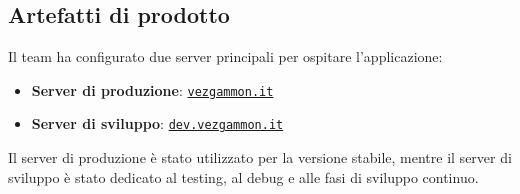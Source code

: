 \documentclass{article}
\begin{document}
\subsection{Artefatti di prodotto}

Il team ha configurato due server principali per ospitare l'applicazione:
\begin{itemize}
    \item \textbf{Server di produzione}: \href{https://vezgammon.it}{\texttt{vezgammon.it}}
    \item \textbf{Server di sviluppo}: \href{https://dev.vezgammon.it}{\texttt{dev.vezgammon.it}}
\end{itemize}
Il server di produzione è stato utilizzato per la versione stabile, mentre il server di sviluppo è stato dedicato al testing, al debug e alle fasi di sviluppo continuo.
\end{document}
